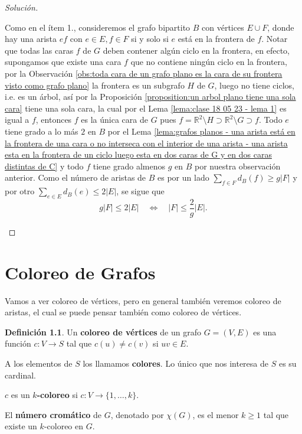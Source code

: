\documentclass[12pt]{report}
\theoremstyle{plain}
\theoremstyle{definition}
\newtheorem{definition}[theorem]{Definición}
\newenvironment{solution}{\begin{proof}[Solución]}{\end{proof}}
\newcommand{\reals}{\mathbb{R}}
\newcommand{\abs}[1]{\left \vert #1 \right \vert}
\begin{document}
\begin{solution}
\begin{enumerate}
 Como en el ítem 1., consideremos el grafo bipartito $B$ con vértices $E \cup F$, donde hay una arista $ef$ con $e \in E, f \in F$ si y solo si $e$ está en la frontera de $f$. Notar que todas las caras $f$ de $G$ deben contener algún ciclo en la frontera, en efecto, supongamos que existe una cara $f$ que no contiene ningún ciclo en la frontera, por la Observación \ref{obs:toda cara de un grafo plano es la cara de su frontera visto como grafo plano} la frontera es un subgrafo $H$ de $G$, luego no tiene ciclos, i.e. es un árbol, así por la Proposición \ref{proposition:un arbol plano tiene una sola cara} tiene una sola cara, la cual por el Lema \ref{lema:clase 18 05 23 - lema 1} es igual a $f$, entonces $f$ es la única cara de $G$ pues $f = \reals^2 \setminus H  \supset \reals^2 \setminus G \supset f$. Todo $e$ tiene grado a lo más $2$ en $B$ por el Lema \ref{lema:grafos planos - una arista está en la frontera de una cara o no interseca con el interior de una arista - una arista esta en la frontera de un ciclo luego esta en dos caras de G y en dos caras distintas de C} y todo $f$ tiene grado almenos $g$ en $B$ por nuestra observación anterior. Como el número de aristas de $B$ es por un lado $\sum_{f \in F} d_B (f) \geq g \abs F$ y por otro $\sum_{e \in E} d_B (e) \leq 2 \abs E$, se sigue que
 \[
     g \abs F \leq 2 \abs E \quad \Leftrightarrow \quad \abs F \leq \frac 2 g \abs E.
 \]
\end{enumerate}
\end{solution}



\chapter{Coloreo de Grafos}






Vamos a ver coloreo de vértices, pero en general también veremos coloreo de aristas, el cual se puede pensar también como coloreo de vértices.

\begin{definition}
Un \textbf{coloreo de vértices} de un grafo $G = (V,E)$ es una función $c : V \rightarrow S$ tal que $c(u) \neq c(v)$ si $uv \in E$.


A los elementos de $S$ los llamamos \textbf{colores}. Lo único que nos interesa de $S$ es su cardinal.

$c$ es un \textbf{$k$-coloreo} si $c : V \rightarrow \{1, \ldots, k\}$.

El \textbf{número cromático} de $G$, denotado por $\chi (G)$, es el menor $k \geq 1$ tal que existe un $k$-coloreo en $G$.
\end{definition}
\end{document}
